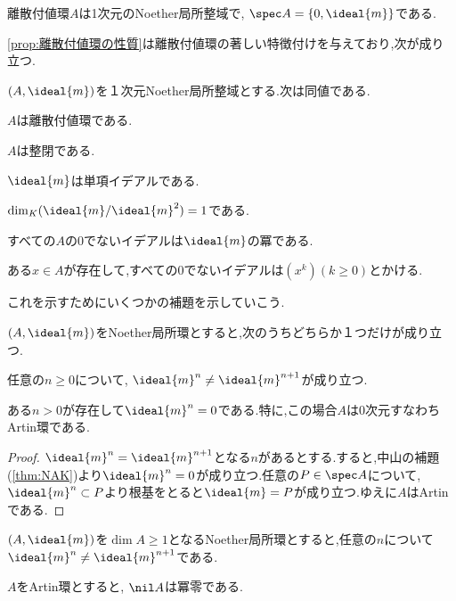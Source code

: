 \begin{cor}
	離散付値環$A$は1次元のNoether局所整域で, $\spec A=\{0,\ideal{m}\}$である.
\end{cor}

\ref{prop:離散付値環の性質}は離散付値環の著しい特徴付けを与えており,次が成り立つ.

\begin{thm}\label{thm:DVRの特徴づけ}
	$(A,\ideal{m})$を１次元Noether局所整域とする.次は同値である.
	\begin{sakura}
		\item $A$は離散付値環である.
		\item $A$は整閉である.
		\item $\ideal{m}$は単項イデアルである.
		\item $\dim_K (\ideal{m}/\ideal{m}^2)=1$である.
		\item すべての$A$の0でないイデアルは$\ideal{m}$の冪である.
		\item ある$x\in A$が存在して,すべての0でないイデアルは$(x^k) (k\geq0)$とかける.
	\end{sakura}
\end{thm}

これを示すためにいくつかの補題を示していこう.

\begin{prop}\label{prop:局所環がm^n=0ならArtin}
	$(A,\ideal{m})$をNoether局所環とすると,次のうちどちらか１つだけが成り立つ.
	\begin{sakura}
		\item 任意の$n\geq0$について, $\ideal{m}^n\neq\ideal{m}^{n+1}$が成り立つ.
		\item ある$n>0$が存在して$\ideal{m}^n=0$である.特に,この場合$A$は0次元すなわちArtin環である.
	\end{sakura}
\end{prop}

\begin{proof}
	$\ideal{m}^n=\ideal{m}^{n+1}$となる$n$があるとする.すると,中山の補題(\ref{thm:NAK})より$\ideal{m}^n=0$が成り立つ.任意の$P\in\spec A$について, $\ideal{m}^n\subset P$より根基をとると$\ideal{m}=P$が成り立つ.ゆえに$A$はArtinである.
\end{proof}

\begin{cor}\label{lem:DVR-A}
	$(A,\ideal{m})$を$\dim A\geq1$となるNoether局所環とすると,任意の$n$について$\ideal{m}^n\neq\ideal{m}^{n+1}$である.
\end{cor}

\begin{lem}\label{lem:Artinならnil Aは冪零}
	$A$をArtin環とすると, $\nil A$は冪零である.
\end{lem}

